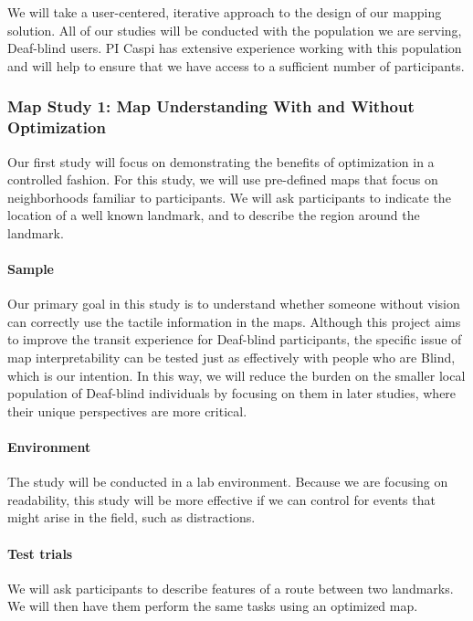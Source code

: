 We will take a user-centered, iterative approach to the design of our mapping solution. All of our studies will be conducted with the population we are serving, Deaf-blind users. PI Caspi has extensive experience working with this population  and will  help to ensure that we have access to a sufficient number of participants. 

\subsubsection{Map Study 1: Map Understanding With and Without Optimization}
\label{sec:lab-tests}
Our first study will focus on demonstrating the benefits of optimization in a controlled fashion. For this study, we will use pre-defined maps that focus on neighborhoods familiar to participants. We will ask participants to indicate the location of a well known landmark, and to describe the region around the landmark. 

\paragraph{Sample}
Our primary goal in this study is to understand whether someone without vision can correctly use the tactile information in the maps. Although this project aims to improve the transit experience for Deaf-blind participants, the specific issue of map interpretability can be tested just as effectively with people who are Blind, which is our intention. In this way, we will reduce the burden on the smaller local population of Deaf-blind individuals by focusing on them in later studies, where their unique perspectives are more critical.

\paragraph{Environment}
The study will be conducted in a lab environment. Because we are focusing on readability, this study will be more effective if we can control for events that might arise in the field, such as distractions.

\paragraph{Test trials}
We will ask participants to describe features of a route between two landmarks. We will then have them perform the same tasks using an optimized map. 

